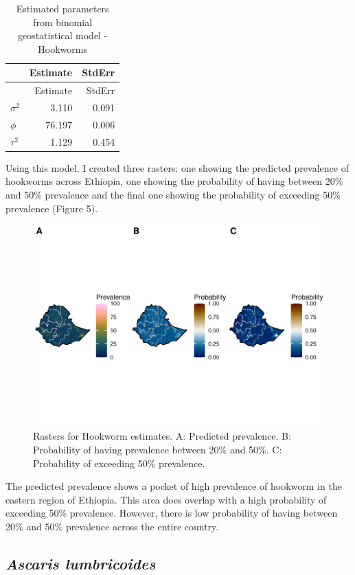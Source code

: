 \documentclass[
]{article}
\begin{document}
\begin{longtable}[]{@{}lrr@{}}
\caption{Estimated parameters from binomial geostatistical model -
Hookworms}\tabularnewline
\toprule
& Estimate & StdErr \\
\midrule
\endfirsthead
\toprule
& Estimate & StdErr \\
\midrule
\endhead
\(\sigma^2\) & 3.110 & 0.091 \\
\(\phi\) & 76.197 & 0.006 \\
\(\tau^2\) & 1.129 & 0.454 \\
\bottomrule
\end{longtable}

Using this model, I created three rasters: one showing the predicted
prevalence of hookworms across Ethiopia, one showing the probability of
having between 20\% and 50\% prevalence and the final one showing the
probability of exceeding 50\% prevalence (Figure 5).

\begin{figure}
\centering
\includegraphics{write_up_files/figure-latex/HK.prediction.rasters-1.pdf}
\caption{Rasters for Hookworm estimates. A: Predicted prevalence. B:
Probability of having prevalence between 20\% and 50\%. C: Probability
of exceeding 50\% prevalence.}
\end{figure}

The predicted prevalence shows a pocket of high prevalence of hookworm
in the eastern region of Ethiopia. This area does overlap with a high
probability of exceeding 50\% prevalence. However, there is low
probability of having between 20\% and 50\% prevalence across the entire
country.

\hypertarget{ascaris-lumbricoides}{%
\subsection{\texorpdfstring{\emph{Ascaris
lumbricoides}}{Ascaris lumbricoides}}\label{ascaris-lumbricoides}}
\end{document}
